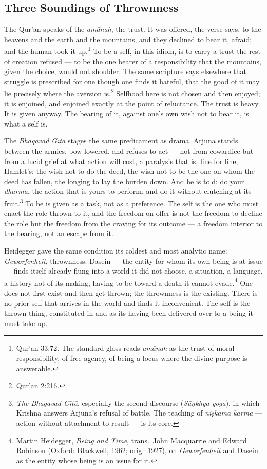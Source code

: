 \documentclass[11pt]{article}
\begin{document}
\subsection{Three Soundings of Thrownness}

The Qur'an speaks of the \emph{am\=anah}, the trust. It was offered, the verse says, to the heavens and the earth and the mountains, and they declined to bear it, afraid; and the human took it up.\footnote{Qur'an 33:72. The standard gloss reads \emph{am\=anah} as the trust of moral responsibility, of free agency, of being a locus where the divine purpose is answerable.} To be a self, in this idiom, is to carry a trust the rest of creation refused --- to be the one bearer of a responsibility that the mountains, given the choice, would not shoulder. The same scripture says elsewhere that struggle is prescribed for one though one finds it hateful, that the good of it may lie precisely where the aversion is.\footnote{Qur'an 2:216.} Selfhood here is not chosen and then enjoyed; it is enjoined, and enjoined exactly at the point of reluctance. The trust is heavy. It is given anyway. The bearing of it, against one's own wish not to bear it, is what a self is.

The \emph{Bhagavad G\=\i t\=a} stages the same predicament as drama. Arjuna stands between the armies, bow lowered, and refuses to act --- not from cowardice but from a lucid grief at what action will cost, a paralysis that is, line for line, Hamlet's: the wish not to do the deed, the wish not to be the one on whom the deed has fallen, the longing to lay the burden down. And he is told: do your \emph{dharma}, the action that is yours to perform, and do it without clutching at its fruit.\footnote{\emph{The Bhagavad G\=\i t\=a}, especially the second discourse (\emph{S\=a\d{n}khya-yoga}), in which Krishna answers Arjuna's refusal of battle. The teaching of \emph{ni\d{s}k\=ama karma} --- action without attachment to result --- is its core.} To be is given as a task, not as a preference. The self is the one who must enact the role thrown to it, and the freedom on offer is not the freedom to decline the role but the freedom from the craving for its outcome --- a freedom interior to the bearing, not an escape from it.

Heidegger gave the same condition its coldest and most analytic name: \emph{Geworfenheit}, thrownness. Dasein --- the entity for whom its own being is at issue --- finds itself already flung into a world it did not choose, a situation, a language, a history not of its making, having-to-be toward a death it cannot evade.\footnote{Martin Heidegger, \emph{Being and Time}, trans.\ John Macquarrie and Edward Robinson (Oxford: Blackwell, 1962; orig.\ 1927), on \emph{Geworfenheit} and Dasein as the entity whose being is an issue for it.} One does not first exist and then get thrown; the thrownness is the existing. There is no prior self that arrives in the world and finds it inconvenient. The self is the thrown thing, constituted in and as its having-been-delivered-over to a being it must take up.
\end{document}
